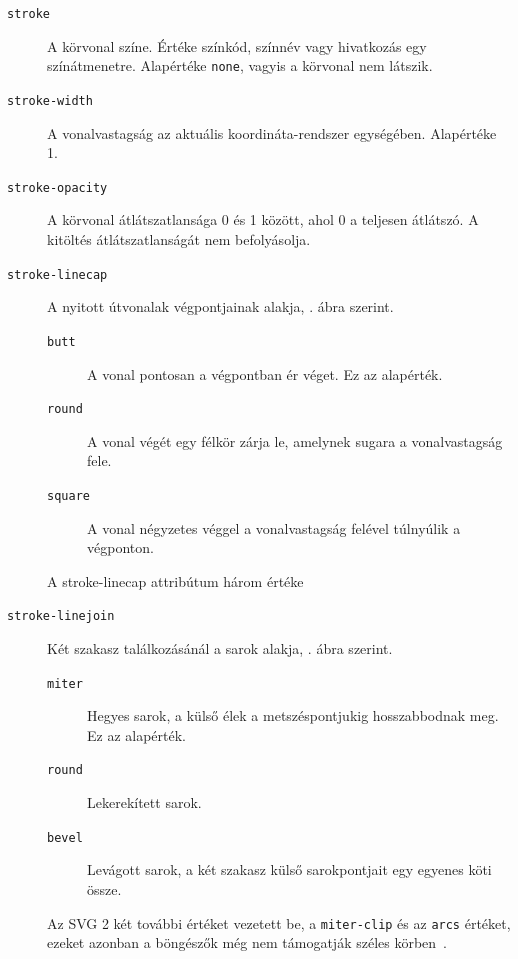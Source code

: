 \begin{description}
\item[\texttt{stroke}] A körvonal színe. Értéke színkód, színnév vagy hivatkozás egy színátmenetre. Alapértéke \texttt{none}, vagyis a körvonal nem látszik.
\item[\texttt{stroke-width}] A vonalvastagság az aktuális koordináta-rendszer egységében. Alapértéke 1.
\item[\texttt{stroke-opacity}] A körvonal átlátszatlansága 0 és 1 között, ahol 0 a teljesen átlátszó. A kitöltés átlátszatlanságát nem befolyásolja.
\item[\texttt{stroke-linecap}] A nyitott útvonalak végpontjainak alakja, . ábra szerint.
\begin{description}
    \item[\texttt{butt}] A vonal pontosan a végpontban ér véget. Ez az alapérték.
    \item[\texttt{round}] A vonal végét egy félkör zárja le, amelynek sugara a vonalvastagság fele.
    \item[\texttt{square}] A vonal négyzetes véggel a vonalvastagság felével túlnyúlik a végponton.
\end{description}
\end{description}

\begin{figure}[H]
    \centering
    
    \caption{A stroke-linecap attribútum három értéke}
    \label{fig:example_stroke-linecap}
\end{figure}

\begin{description}
\item[\texttt{stroke-linejoin}] Két szakasz találkozásánál a sarok alakja, . ábra szerint.
\begin{description}
    \item[\texttt{miter}] Hegyes sarok, a külső élek a metszéspontjukig hosszabbodnak meg. Ez az alapérték.
    \item[\texttt{round}] Lekerekített sarok.
    \item[\texttt{bevel}] Levágott sarok, a két szakasz külső sarokpontjait egy egyenes köti össze.
\end{description}
Az SVG 2 két további értéket vezetett be, a \texttt{miter-clip} és az \texttt{arcs} értéket, ezeket azonban a böngészők még nem támogatják széles körben~\cite{mdn-linejoin}.
\end{description}

